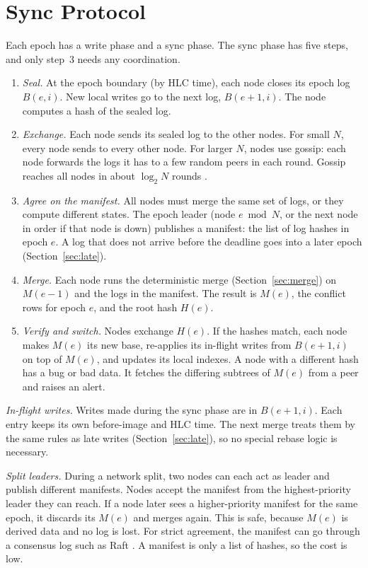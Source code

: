 \documentclass[journal]{IEEEtran}
\begin{document}
\section{Sync Protocol}\label{sec:sync}
Each epoch has a write phase and a sync phase. The sync phase has five steps, and only step~3 needs any coordination.
\begin{enumerate}
\item \emph{Seal.} At the epoch boundary (by HLC time), each node closes its epoch log $B(e,i)$. New local writes go to the next log, $B(e{+}1,i)$. The node computes a hash of the sealed log.
\item \emph{Exchange.} Each node sends its sealed log to the other nodes. For small $N$, every node sends to every other node. For larger $N$, nodes use gossip: each node forwards the logs it has to a few random peers in each round. Gossip reaches all nodes in about $\log_2 N$ rounds \cite{demers1987}.
\item \emph{Agree on the manifest.} All nodes must merge the same set of logs, or they compute different states. The epoch leader (node $e \bmod N$, or the next node in order if that node is down) publishes a manifest: the list of log hashes in epoch $e$. A log that does not arrive before the deadline goes into a later epoch (Section~\ref{sec:late}).
\item \emph{Merge.} Each node runs the deterministic merge (Section~\ref{sec:merge}) on $M(e{-}1)$ and the logs in the manifest. The result is $M(e)$, the conflict rows for epoch $e$, and the root hash $H(e)$.
\item \emph{Verify and switch.} Nodes exchange $H(e)$. If the hashes match, each node makes $M(e)$ its new base, re-applies its in-flight writes from $B(e{+}1,i)$ on top of $M(e)$, and updates its local indexes. A node with a different hash has a bug or bad data. It fetches the differing subtrees of $M(e)$ from a peer and raises an alert.
\end{enumerate}

\emph{In-flight writes.} Writes made during the sync phase are in $B(e{+}1,i)$. Each entry keeps its own before-image and HLC time. The next merge treats them by the same rules as late writes (Section~\ref{sec:late}), so no special rebase logic is necessary.

\emph{Split leaders.} During a network split, two nodes can each act as leader and publish different manifests. Nodes accept the manifest from the highest-priority leader they can reach. If a node later sees a higher-priority manifest for the same epoch, it discards its $M(e)$ and merges again. This is safe, because $M(e)$ is derived data and no log is lost. For strict agreement, the manifest can go through a consensus log such as Raft \cite{ongaro2014}. A manifest is only a list of hashes, so the cost is low.
\end{document}
